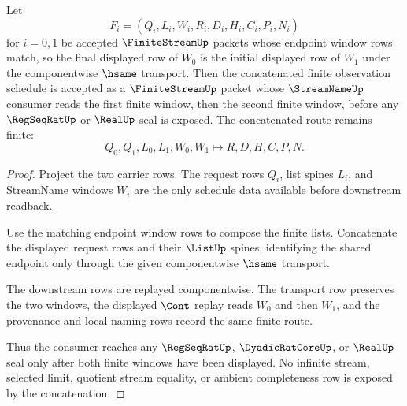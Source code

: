 \begin{theorem}
\label{thm:finite-stream-window-concatenation}
Let
$$
F_i=(Q_i,L_i,W_i,R_i,D_i,H_i,C_i,P_i,N_i)
$$
for $i=0,1$ be accepted $\FiniteStreamUp$ packets whose endpoint window rows match, so the final displayed row of $W_0$ is the initial displayed row of $W_1$ under the componentwise $\hsame$ transport. Then the concatenated finite observation schedule is accepted as a $\FiniteStreamUp$ packet whose $\StreamNameUp$ consumer reads the first finite window, then the second finite window, before any $\RegSeqRatUp$ or $\RealUp$ seal is exposed. The concatenated route remains finite:
$$
Q_0,Q_1,L_0,L_1,W_0,W_1 \longmapsto R,D,H,C,P,N .
$$
\end{theorem}
\begin{proof}
Project the two carrier rows. The request rows $Q_i$, list spines $L_i$, and StreamName windows $W_i$ are the only schedule data available before downstream readback.

Use the matching endpoint window rows to compose the finite lists. Concatenate the displayed request rows and their $\ListUp$ spines, identifying the shared endpoint only through the given componentwise $\hsame$ transport.

The downstream rows are replayed componentwise. The transport row preserves the two windows, the displayed $\Cont$ replay reads $W_0$ and then $W_1$, and the provenance and local naming rows record the same finite route.

Thus the consumer reaches any $\RegSeqRatUp$, $\DyadicRatCoreUp$, or $\RealUp$ seal only after both finite windows have been displayed. No infinite stream, selected limit, quotient stream equality, or ambient completeness row is exposed by the concatenation.
\end{proof}

